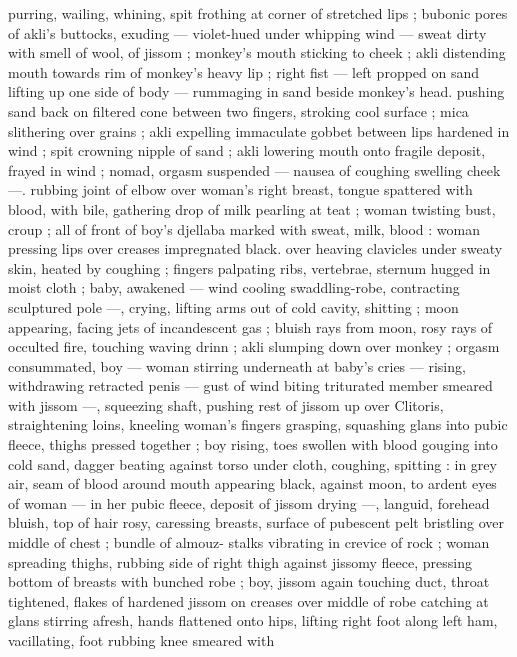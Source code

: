 purring, wailing, whining, spit frothing at corner of stretched lips ; 
bubonic pores of akli's buttocks, exuding --- violet-hued under 
whipping wind --- sweat dirty with smell of wool, of jissom ; 
monkey's mouth sticking to cheek ; akli distending mouth towards 
rim of monkey's heavy lip ; right fist --- left propped on sand lifting 
up one side of body --- rummaging in sand beside monkey's head. 
pushing sand back on filtered cone between two fingers, stroking 
cool surface ; mica slithering over grains ; akli expelling immaculate 
gobbet between lips hardened in wind ; spit crowning nipple of sand 
; akli lowering mouth onto fragile deposit, frayed in wind ; nomad, 
orgasm suspended --- nausea of coughing swelling cheek ---. 
rubbing joint of elbow over woman's right breast, tongue spattered 
with blood, with bile, gathering drop of milk pearling at teat ; woman 
twisting bust, croup ; all of front of boy's djellaba marked with sweat, 
milk, blood : woman pressing lips over creases impregnated black. 
over heaving clavicles under sweaty skin, heated by coughing ; 
fingers palpating ribs, vertebrae, sternum hugged in moist cloth ; 
baby, awakened --- wind cooling swaddling-robe, contracting 
sculptured pole ---, crying, lifting arms out of cold cavity, shitting ; 
moon appearing, facing jets of incandescent gas ; bluish rays from 
moon, rosy rays of occulted fire, touching waving drinn ; akli 
slumping down over monkey ; orgasm consummated, boy --- woman 
stirring underneath at baby's cries --- rising, withdrawing retracted 
penis --- gust of wind biting triturated member smeared with jissom 
---, squeezing shaft, pushing rest of jissom up over Clitoris, 
straightening loins, kneeling woman's fingers grasping, squashing 
glans into pubic fleece, thighs pressed together ; boy rising, toes 
swollen with blood gouging into cold sand, dagger beating against 
torso under cloth, coughing, spitting : in grey air, seam of blood 
around mouth appearing black, against moon, to ardent eyes of 
woman --- in her pubic fleece, deposit of jissom drying ---, languid, 
forehead bluish, top of hair rosy, caressing breasts, surface of 
pubescent pelt bristling over middle of chest ; bundle of almouz- 
stalks vibrating in crevice of rock ; woman spreading thighs, rubbing 
side of right thigh against jissomy fleece, pressing bottom of breasts 
with bunched robe ; boy, jissom again touching duct, throat 
tightened, flakes of hardened jissom on creases over middle of robe 
catching at glans stirring afresh, hands flattened onto hips, lifting 
right foot along left ham, vacillating, foot rubbing knee smeared with 
